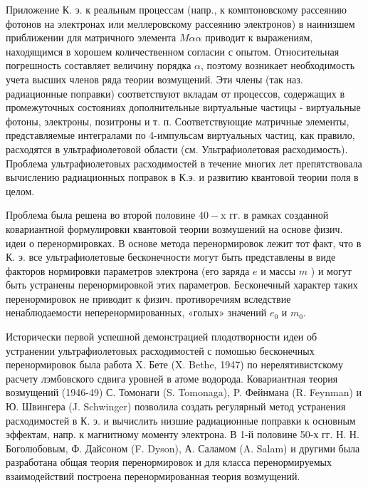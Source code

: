 \documentclass[10pt]{article}
\begin{document}
Приложение К. э. к реальным процессам (напр., к комптоновскому рассеянию фотонов на электронах или меллеровскому рассеянию электронов) в наинизшем приближении для матричного элемента $M \alpha \alpha$ приводит к выражениям, находящимся в хорошем количественном согласии с опытом. Относительная погрешность составляет величину порядка $\alpha$, поэтому возникает необходимость учета высших членов ряда теории возмущений. Эти члены (так наз. радиационные поправки) соответствуют вкладам от процессов, содержащих в промежуточных состояниях дополнительные виртуальные частицы - виртуальные фотоны, электроны, позитроны и т. п. Соответствующие матричные элементы, представляемые интегралами по 4-импульсам виртуальных частиц, как правило, расходятся в ультрафиолетовой области (см. Ультрафиолетовая расходимость). Проблема ультрафиолетовых расходимостей в течение многих лет препятствовала вычислению радиационных поправок в К.э. и развитию квантовой теории поля в целом.



Проблема была решена во второй половине $40-\mathrm{x}$ гг. в рамках созданной ковариантной формулировки квантовой теории возмушений на основе физич. идеи о перенормировках. В основе метода перенормировок лежит тот факт, что в К. э. все ультрафиолетовые бесконечности могут быть представлены в виде факторов нормировки параметров электрона (его заряда $e$ и массы $m$ ) и могут быть устранены перенормировкой этих параметров. Бесконечный характер таких перенормировок не приводит к физич. противоречиям вследствие ненаблюдаемости неперенормированных, «голых» значений $e_{0}$ и $m_{0}$.



Исторически первой успешной демонстрацией плодотворности идеи об устранении ультрафиолетовых расходимостей с помошью бесконечных перенормировок была работа X. Бете (X. Bethe, 1947) по нерелятивистскому расчету лэмбовского сдвига уровней в атоме водорода. Ковариантная теория возмущений (1946-49) С. Томонаги (S. Tomonaga), P. Фейнмана (R. Feynman) и Ю. Швингера (J. Schwinger) позволила создать регулярный метод устранения расходимостей в К. э. и вычислить низшие радиационные поправки к основным эффектам, напр. к магнитному моменту электрона. В 1-й половине 50-х гг. Н. Н. Боголюбовым, Ф. Дайсоном (F. Dyson), А. Саламом (A. Salam) и другими была разработана общая теория перенормировок и для класса перенормируемых взаимодействий построена перенормированная теория возмущений.
\end{document}

